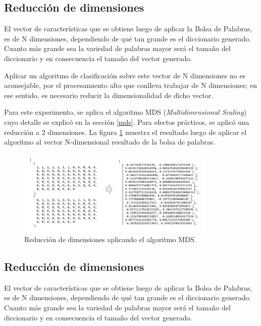 \subsection{Reducción de dimensiones}

El vector de características que se obtiene luego de aplicar la Bolsa de Palabras, es de N dimensiones, dependiendo de qué tan grande es el diccionario generado. Cuanto más grande sea la variedad de palabras mayor será el tamaño del diccionario y en consecuencia el tamaño del vector generado.

Aplicar un algoritmo de clasificación sobre este vector de N dimensiones no es aconsejable, por el procesamiento alto que conlleva trabajar de N dimensiones; en ese sentido, es necesario reducir la dimensionalidad de dicho vector.

Para este experimento, se aplica el algoritmo MDS (\emph{Multidimensional Scaling}) cuyo detalle se explicó en la sección \ref{mds}. Para efectos prácticos, se aplicó una reducción a 2 dimensiones. La figura \ref{fig:mds} muestra el resultado luego de aplicar el algoritmo al vector N-dimensional resultado de la bolsa de palabras.

\begin{figure}[h!]
	\begin{center}
	\includegraphics[angle=0,width=9.5cm]{Graficos/mds}
	\caption{Reducción de dimensiones aplicando el algoritmo MDS.}
	\label{fig:mds}
  \end{center}
\end{figure}

\subsection{Reducción de dimensiones}

El vector de características que se obtiene luego de aplicar la Bolsa de Palabras, es de N dimensiones, dependiendo de qué tan grande es el diccionario generado. Cuanto más grande sea la variedad de palabras mayor será el tamaño del diccionario y en consecuencia el tamaño del vector generado.

